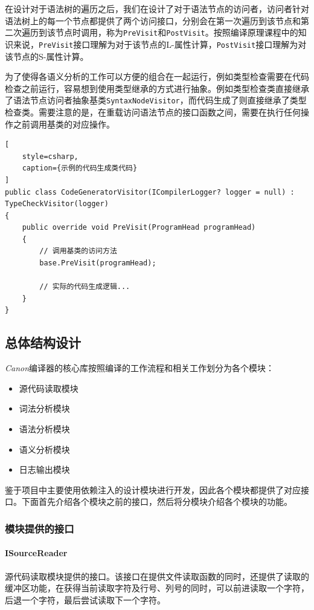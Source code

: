 \documentclass[../main.tex]{subfiles}
\begin{document}
在设计对于语法树的遍历之后，我们在设计了对于语法节点的访问者，访问者针对语法树上的每一个节点都提供了两个访问接口，分别会在第一次遍历到该节点和第二次遍历到该节点时调用，称为\texttt{PreVisit}和\texttt{PostVisit}。按照编译原理课程中的知识来说，\texttt{PreVisit}接口理解为对于该节点的L-属性计算，\texttt{PostVisit}接口理解为对该节点的S-属性计算。

为了使得各语义分析的工作可以方便的组合在一起运行，例如类型检查需要在代码检查之前运行，容易想到使用类型继承的方式进行抽象。例如类型检查类直接继承了语法节点访问者抽象基类\texttt{SyntaxNodeVisitor}，而代码生成了则直接继承了类型检查类。需要注意的是，在重载访问语法节点的接口函数之间，需要在执行任何操作之前调用基类的对应操作。

\begin{lstlisting}[
    style=csharp,
    caption={示例的代码生成类代码}
]
public class CodeGeneratorVisitor(ICompilerLogger? logger = null) : TypeCheckVisitor(logger)
{
    public override void PreVisit(ProgramHead programHead)
    {
        // 调用基类的访问方法
        base.PreVisit(programHead);

        // 实际的代码生成逻辑...
    }
}
\end{lstlisting}

\subsection{总体结构设计}

\textit{Canon}编译器的核心库按照编译的工作流程和相关工作划分为各个模块：
\begin{itemize}
    \item 源代码读取模块
    \item 词法分析模块
    \item 语法分析模块
    \item 语义分析模块
    \item 日志输出模块
\end{itemize}

鉴于项目中主要使用依赖注入的设计模块进行开发，因此各个模块都提供了对应接口。下面首先介绍各个模块之前的接口，然后将分模块介绍各个模块的功能。

\subsubsection{模块提供的接口}

\paragraph{ISourceReader} 源代码读取模块提供的接口。该接口在提供文件读取函数的同时，还提供了读取的缓冲区功能，在获得当前读取字符及行号、列号的同时，可以前进读取一个字符，后退一个字符，最后尝试读取下一个字符。
\end{document}
